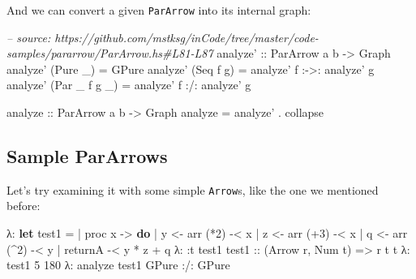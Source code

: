 \documentclass[]{article}
\newenvironment{Shaded}{}{}
\newcommand{\KeywordTok}[1]{\textcolor[rgb]{0.00,0.44,0.13}{\textbf{#1}}}
\newcommand{\DataTypeTok}[1]{\textcolor[rgb]{0.56,0.13,0.00}{#1}}
\newcommand{\DecValTok}[1]{\textcolor[rgb]{0.25,0.63,0.44}{#1}}
\newcommand{\CommentTok}[1]{\textcolor[rgb]{0.38,0.63,0.69}{\textit{#1}}}
\newcommand{\OtherTok}[1]{\textcolor[rgb]{0.00,0.44,0.13}{#1}}
\newcommand{\FunctionTok}[1]{\textcolor[rgb]{0.02,0.16,0.49}{#1}}
\newcommand{\NormalTok}[1]{#1}
\begin{document}
And we can convert a given \texttt{ParArrow} into its internal graph:

\begin{Shaded}
\begin{Highlighting}[]
\CommentTok{-- source: https://github.com/mstksg/inCode/tree/master/code-samples/pararrow/ParArrow.hs#L81-L87}
\OtherTok{analyze' ::} \DataTypeTok{ParArrow}\NormalTok{ a b }\OtherTok{->} \DataTypeTok{Graph}
\NormalTok{analyze' (}\DataTypeTok{Pure}\NormalTok{ _) }\FunctionTok{=} \DataTypeTok{GPure}
\NormalTok{analyze' (}\DataTypeTok{Seq}\NormalTok{ f g) }\FunctionTok{=}\NormalTok{ analyze' f }\FunctionTok{:->:}\NormalTok{ analyze' g}
\NormalTok{analyze' (}\DataTypeTok{Par}\NormalTok{ _ f g _) }\FunctionTok{=}\NormalTok{ analyze' f }\FunctionTok{:/:}\NormalTok{ analyze' g}

\OtherTok{analyze ::} \DataTypeTok{ParArrow}\NormalTok{ a b }\OtherTok{->} \DataTypeTok{Graph}
\NormalTok{analyze }\FunctionTok{=}\NormalTok{ analyze' }\FunctionTok{.}\NormalTok{ collapse}
\end{Highlighting}
\end{Shaded}

\subsection{Sample ParArrows}\label{sample-pararrows}

Let's try examining it with some simple \texttt{Arrow}s, like the one we
mentioned before:

\begin{Shaded}
\begin{Highlighting}[]
\NormalTok{λ}\FunctionTok{:} \KeywordTok{let}\NormalTok{ test1 }\FunctionTok{=}
 \FunctionTok{|}\NormalTok{       proc x }\OtherTok{->} \KeywordTok{do}
 \FunctionTok{|}\NormalTok{       y }\OtherTok{<-}\NormalTok{ arr (}\FunctionTok{*}\DecValTok{2}\NormalTok{) }\FunctionTok{-<}\NormalTok{ x}
 \FunctionTok{|}\NormalTok{       z }\OtherTok{<-}\NormalTok{ arr (}\FunctionTok{+}\DecValTok{3}\NormalTok{) }\FunctionTok{-<}\NormalTok{ x}
 \FunctionTok{|}\NormalTok{       q }\OtherTok{<-}\NormalTok{ arr (}\FunctionTok{^}\DecValTok{2}\NormalTok{) }\FunctionTok{-<}\NormalTok{ y}
 \FunctionTok{|}\NormalTok{       returnA }\FunctionTok{-<}\NormalTok{ y }\FunctionTok{*}\NormalTok{ z }\FunctionTok{+}\NormalTok{ q}
\NormalTok{λ}\FunctionTok{:} \FunctionTok{:}\NormalTok{t test1}
\OtherTok{test1 ::}\NormalTok{ (}\DataTypeTok{Arrow}\NormalTok{ r, }\DataTypeTok{Num}\NormalTok{ t) }\OtherTok{=>}\NormalTok{ r t t}
\NormalTok{λ}\FunctionTok{:}\NormalTok{ test1 }\DecValTok{5}
\DecValTok{180}
\NormalTok{λ}\FunctionTok{:}\NormalTok{ analyze test1}
\DataTypeTok{GPure} \FunctionTok{:/:} \DataTypeTok{GPure}
\end{Highlighting}
\end{Shaded}
\end{document}
